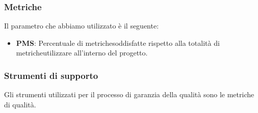 \subsubsection{Metriche} %
Il parametro che abbiamo utilizzato è il seguente:
	\begin{itemize}
		\item \textbf{PMS}: Percentuale di metriche\glosp soddisfatte rispetto alla totalità di metriche\glosp utilizzare all'interno del progetto\glo.
	\end{itemize}
\subsubsection{Strumenti di supporto}
Gli strumenti utilizzati per il processo di garanzia della qualità sono le metriche di qualità.
